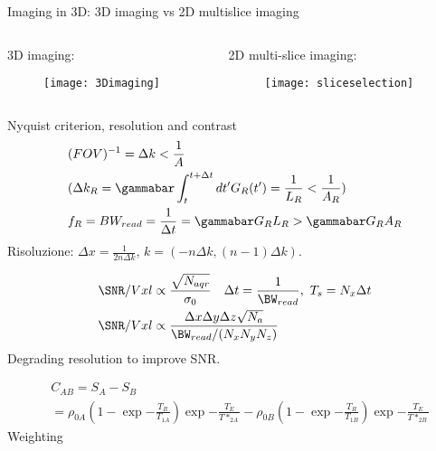 \begin{frame}[allowframebreaks]{Imaging in 3D: 3D imaging  vs 2D multislice imaging}
\begin{columns}[T]
\begin{column}{0.5\textwidth}
3D imaging:
\begin{figure}[!ht]\texttt{[image: 3Dimaging]}\label{fig:3Dimaging}\end{figure}
\end{column}
\begin{column}{0.49\textwidth}
2D multi-slice imaging:
\begin{figure}[!ht]\texttt{[image: sliceselection]}\label{fig:sliceselection}\end{figure}
\end{column}
\end{columns}
\end{frame}

\begin{frame}[allowframebreaks]{Nyquist criterion, resolution and contrast}
\begin{align*}
&(FOV)^{-1}=\Delta k<\frac{1}{A}\\
&(\Delta k_R=\gammabar\int_t^{t+\Delta t}d t'G_R(t')=\frac{1}{L_R}<\frac{1}{A_R})\\
&f_R=BW_{read}=\frac{1}{\Delta t}=\gammabar G_RL_R>\gammabar G_RA_R
\end{align*}
Risoluzione: $\Delta x=\frac{1}{2n\Delta k}$, $k=(-n\Delta k,(n-1)\Delta k)$.

\begin{align*}
&\SNR/Vxl\propto\frac{\sqrt{N_{aqr}}}{\sigma_0}\quad \Delta t= \frac{1}{\BW_{read}},\ T_s=N_x\Delta t\\
&\SNR/Vxl\propto \frac{\Delta x\Delta y\Delta z\sqrt{N_a}}{\BW_{read}/(N_xN_yN_z)}
\end{align*}
Degrading resolution to improve SNR.

\begin{align*}
&C_{AB}=S_A-S_B\\
&=\rho_{0A}(1-\exp{-\frac{T_R}{T_{1A}}})\exp{-\frac{T_E}{T*_{2A}}}-\rho_{0B}(1-\exp{-\frac{T_R}{T_{1B}}})\exp{-\frac{T_E}{T*_{2B}}}
\end{align*}
Weighting
\end{frame}